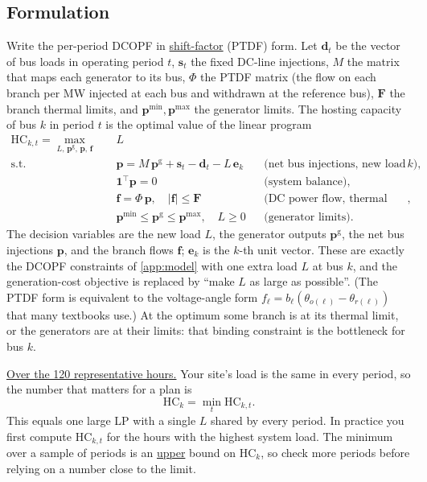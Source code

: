 \documentclass[10pt]{article}
\newcommand{\alert}[1]{{\color{alertblue}\uline{#1}}}
\begin{document}
\subsection{Formulation}
Write the per-period DCOPF in \alert{shift-factor} (PTDF) form. Let
$\mathbf d_t$ be the vector of bus loads in operating period $t$, $\mathbf s_t$
the fixed DC-line injections, $M$ the matrix that maps each generator to its
bus, $\Phi$ the PTDF matrix (the flow on each branch per MW injected at each bus
and withdrawn at the reference bus), $\mathbf F$ the branch thermal limits, and
$\mathbf p^{\min}, \mathbf p^{\max}$ the generator limits. The hosting capacity
of bus $k$ in period $t$ is the optimal value of the linear
program~\cite{alturki2018optimization,wan2026hosting}
\begin{align*}
  \mathrm{HC}_{k,t} = \max_{L,\,\mathbf p^{\mathrm g},\,\mathbf p,\,\mathbf f} \quad & L\\
  \text{s.t.}\quad
  & \mathbf p = M\,\mathbf p^{\mathrm g} + \mathbf s_t - \mathbf d_t - L\,\mathbf e_k
    && \text{(net bus injections, new load at } k),\\
  & \mathbf 1^{\top} \mathbf p = 0 && \text{(system balance)},\\
  & \mathbf f = \Phi\,\mathbf p,\quad |\mathbf f| \le \mathbf F && \text{(DC power flow, thermal limits)},\\
  & \mathbf p^{\min} \le \mathbf p^{\mathrm g} \le \mathbf p^{\max},\quad L \ge 0
    && \text{(generator limits)}.
\end{align*}
The decision variables are the new load $L$, the generator outputs
$\mathbf p^{\mathrm g}$, the net bus injections $\mathbf p$, and the branch
flows $\mathbf f$; $\mathbf e_k$ is the $k$-th unit vector. These are exactly
the DCOPF constraints of \cref{app:model} with one extra load $L$ at bus $k$,
and the generation-cost objective is replaced by ``make $L$ as large as
possible''. (The PTDF form is equivalent to the voltage-angle form
$f_\ell = b_\ell(\theta_{o(\ell)} - \theta_{r(\ell)})$ that many textbooks
use.) At the optimum some branch is
at its thermal limit, or the generators are at their limits: that binding
constraint is the bottleneck for bus $k$.

\alert{Over the 120 representative hours.} Your site's load is the same in
every period, so the number that matters for a plan is
\[
  \mathrm{HC}_k = \min_t \mathrm{HC}_{k,t}.
\]
This equals one large LP with a single $L$ shared by every period. In practice
you first compute $\mathrm{HC}_{k,t}$ for the hours with the highest system
load. The minimum
over a sample of periods is an \alert{upper} bound on $\mathrm{HC}_k$, so check
more periods before relying on a number close to the limit.
\end{document}
